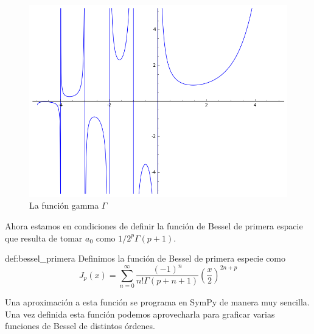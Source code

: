 \begin{figure}[h]
\begin{center}
\includegraphics[scale=.4]{imagenes/gamma.png}
\caption{La función gamma $\Gamma$}
\end{center}
\end{figure}
Ahora estamos en condiciones de definir la función de Bessel de primera espacie que resulta de tomar $a_0$ como $1/2^p\Gamma(p+1)$.

\begin{definicion}{def:bessel_primera} Definimos la función de Bessel de primera especie como
\[J_p(x)=\sum_{n=0}^{\infty}\frac{(-1)^n}{n!\Gamma(p+n+1)}\left(\frac{x}{2}\right)^{2n+p}\]
\end{definicion}


Una aproximación a esta función se programa en SymPy de manera muy sencilla. Una vez definida esta función podemos aprovecharla  para graficar varias funciones de Bessel de distintos órdenes.

